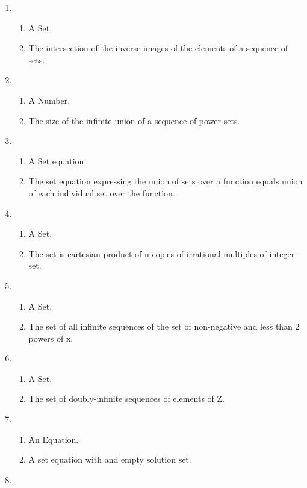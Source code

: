 \documentclass{article}
\begin{document}
\begin{enumerate}
	\item 
	\begin{enumerate}[label=\roman*]
		\item A Set.
		\item The intersection of the inverse images of the elements of a sequence of sets.
	\end{enumerate}
	\item 
\begin{enumerate}[label=\roman*]
	\item A Number.
	\item The size of the infinite union of a sequence of power sets.
\end{enumerate}
	\item 
\begin{enumerate}[label=\roman*]
	\item A Set equation.
	\item The set equation expressing the union of sets over a function equals union of each individual set over the function.
\end{enumerate}
	\item 
\begin{enumerate}[label=\roman*]
	\item A Set.
	\item The set is cartesian product of n copies of irrational multiples of integer set. 
\end{enumerate}
	\item 
\begin{enumerate}[label=\roman*]
	\item A Set.
	\item The set of all infinite sequences of the set of non-negative and less than 2 powers of x.
\end{enumerate}
	\item 
\begin{enumerate}[label=\roman*]
	\item A Set.
	\item The set of doubly-infinite sequences of elements of Z.
\end{enumerate}
	\item 
\begin{enumerate}[label=\roman*]
	\item An Equation.
	\item A set equation with and empty solution set.
\end{enumerate}
	\item 

\end{enumerate}
\end{document}
